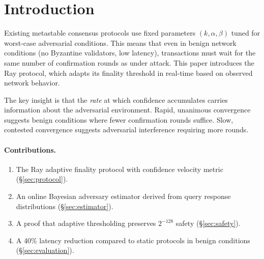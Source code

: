 \section{Introduction}

\label{sec:introduction}

Existing metastable consensus protocols use fixed parameters $(k, \alpha, \beta)$ tuned
for worst-case adversarial conditions. This means that even in benign network conditions
(no Byzantine validators, low latency), transactions must wait for the same number of
confirmation rounds as under attack. This paper introduces the Ray protocol, which
adapts its finality threshold in real-time based on observed network behavior.

The key insight is that the \emph{rate} at which confidence accumulates carries
information about the adversarial environment. Rapid, unanimous convergence suggests
benign conditions where fewer confirmation rounds suffice. Slow, contested convergence
suggests adversarial interference requiring more rounds.

\paragraph{Contributions.}
\begin{enumerate}[nosep]
\item The Ray adaptive finality protocol with confidence velocity metric (\S\ref{sec:protocol}).
\item An online Bayesian adversary estimator derived from query response distributions (\S\ref{sec:estimator}).
\item A proof that adaptive thresholding preserves $2^{-128}$ safety (\S\ref{sec:safety}).
\item A 40\% latency reduction compared to static protocols in benign conditions (\S\ref{sec:evaluation}).
\end{enumerate}

